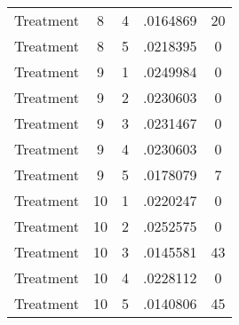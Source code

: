 \begin{tabular}{l*{4}{c}}
Treatment           &           8&           4&    .0164869&          20\\
Treatment           &           8&           5&    .0218395&           0\\
Treatment           &           9&           1&    .0249984&           0\\
Treatment           &           9&           2&    .0230603&           0\\
Treatment           &           9&           3&    .0231467&           0\\
Treatment           &           9&           4&    .0230603&           0\\
Treatment           &           9&           5&    .0178079&           7\\
Treatment           &          10&           1&    .0220247&           0\\
Treatment           &          10&           2&    .0252575&           0\\
Treatment           &          10&           3&    .0145581&          43\\
Treatment           &          10&           4&    .0228112&           0\\
Treatment           &          10&           5&    .0140806&          45\\
\hline\hline
\end{tabular}
